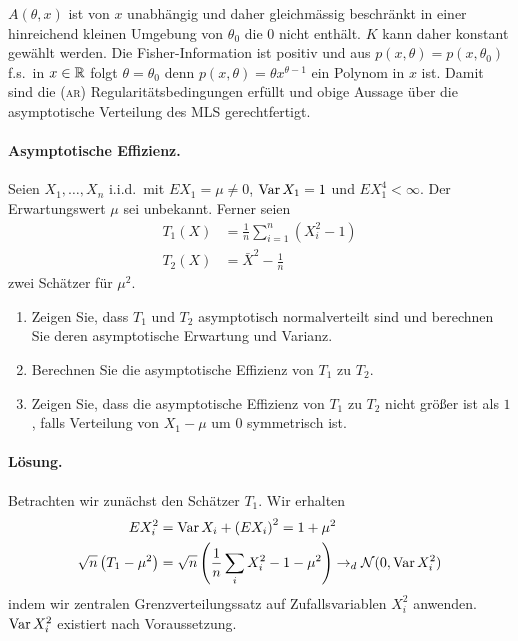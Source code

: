 $A(\theta,x)$ ist von $x$ unabhängig und daher gleichmässig beschränkt in einer
hinreichend kleinen Umgebung von $\theta_0$ die $0$ nicht enthält. $K$ kann daher konstant 
gewählt werden. Die Fisher-Information ist positiv und aus $p(x,\theta)=p(x,\theta_0)$ f.s.\ in
$x\in\mathbb R$ folgt $\theta=\theta_0$ denn $p(x,\theta)= \theta x^{\theta-1}$ ein Polynom in $x$ ist. 
Damit sind die \textsc{(ar)} Regularitätsbedingungen erfüllt und obige Aussage über die
asymptotische Verteilung des MLS gerechtfertigt.








\paragraph{Asymptotische Effizienz.} Seien $X_1,\ldots,X_n$ i.i.d.\ mit $E X_1=\mu\neq 0$,
$\operatorname{Var} X_1 = 1$ und $E X_1^4 < \infty$. Der Erwartungswert $\mu$ sei unbekannt. 
Ferner seien 
\begin{align*}
    T_1(X) &= \frac{1}{n} \sum_{i=1}^{n} \left( X_i^2 -1 \right) \\
    T_2(X) &= {\bar X}^2 - \frac{1}{n}
\end{align*}
zwei Schätzer für $\mu^2$. 
\begin{enumerate}
    \item Zeigen Sie, dass $T_1$ und $T_2$ asymptotisch normalverteilt sind und
        berechnen Sie deren asymptotische Erwartung und Varianz.
    \item Berechnen Sie die asymptotische Effizienz von $T_1$ zu $T_2$.
    \item Zeigen Sie, dass die asymptotische Effizienz von $T_1$ zu $T_2$ nicht
        größer ist als $1$, falls Verteilung von $X_1 -\mu$ um $0$ symmetrisch
        ist.
\end{enumerate}

\paragraph*{Lösung. } Betrachten wir zunächst den Schätzer $T_1$. Wir erhalten
\begin{align*}
    E X_i^2 &=  \operatorname{Var} X_i + \left( E X_i \right)^2 = 1 + \mu^2  \\
    \sqrt{n} \left( T_1 - \mu^2 \right) &= 
    \sqrt{n}\left( \frac{1}{n} \sum_{i}^{} X_i^2 -1 -\mu^2 \right) \to_d \mathcal N(0, \operatorname{Var} X_i^2)
\end{align*}
indem wir zentralen Grenzverteilungssatz auf Zufallsvariablen $X_i^2$ anwenden. $\operatorname{Var} X_i^2$ existiert
nach Voraussetzung.

